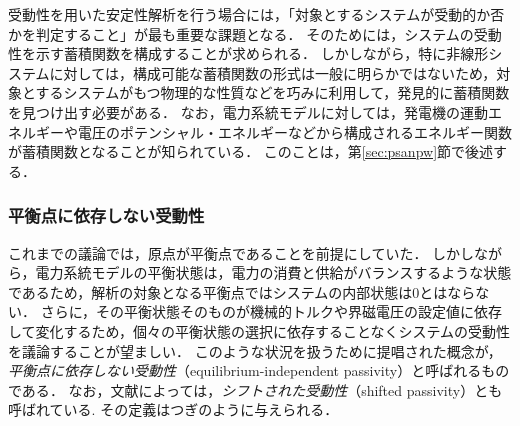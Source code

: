 \documentclass[a4j,10pt,oneside,openany,dvipdfmx]{jsbook}
\begin{document}
受動性を用いた安定性解析を行う場合には，「対象とするシステムが受動的か否かを判定すること」が最も重要な課題となる．
そのためには，システムの受動性を示す蓄積関数を構成することが求められる．
しかしながら，特に非線形システムに対しては，構成可能な蓄積関数の形式は一般に明らかではないため，対象とするシステムがもつ物理的な性質などを巧みに利用して，発見的に蓄積関数を見つけ出す必要がある．
なお，電力系統モデルに対しては，発電機の運動エネルギーや電圧のポテンシャル・エネルギーなどから構成されるエネルギー関数が蓄積関数となることが知られている．
このことは，第\ref{sec:psanpw}節で後述する．

\subsubsection{平衡点に依存しない受動性}

これまでの議論では，原点が平衡点であることを前提にしていた．
しかしながら，電力系統モデルの平衡状態は，電力の消費と供給がバランスするような状態であるため，解析の対象となる平衡点ではシステムの内部状態は0とはならない．
さらに，その平衡状態そのものが機械的トルクや界磁電圧の設定値に依存して変化するため，個々の平衡状態の選択に依存することなくシステムの受動性を議論することが望ましい．
このような状況を扱うために提唱された概念が，\emph{平衡点に依存しない受動性}（equilibrium-independent passivity）と呼ばれるものである\cite{hines2011equilibrium,simpson2019equilibrium}．
なお，文献によっては，\emph{シフトされた受動性}（shifted passivity）とも呼ばれている\cite{monshizadeh2019conditions}.
その定義はつぎのように与えられる．
\end{document}
